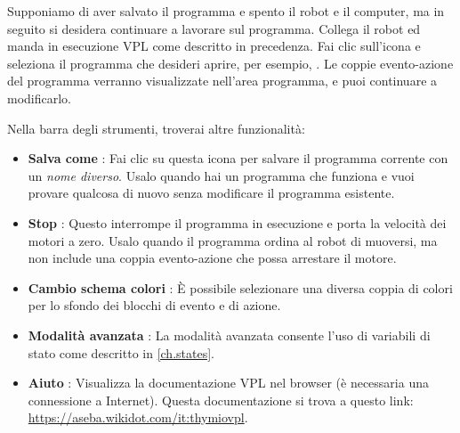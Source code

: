 
Supponiamo di aver salvato il programma e spento il robot e
il computer, ma in seguito si desidera continuare a lavorare sul programma.
Collega il robot ed manda in esecuzione VPL come descritto in precedenza. Fai clic sull'icona
 e seleziona il programma che desideri aprire, per esempio,
. Le coppie evento-azione del programma verranno visualizzate
nell'area programma, e puoi continuare a modificarlo.


Nella barra degli strumenti, troverai altre funzionalità:

\begin{itemize}

\item \textbf{Salva come} :
Fai clic su questa icona per salvare il programma corrente con un \emph{nome diverso}.
Usalo quando hai un programma che funziona e vuoi provare qualcosa di nuovo senza modificare il programma esistente.

\item \textbf{Stop} : Questo interrompe il programma in esecuzione
e porta la velocità dei motori a zero. Usalo quando il programma ordina
al robot di muoversi, ma non include una coppia evento-azione che possa
arrestare il motore.

\item \textbf{Cambio schema colori} : È possibile selezionare una
diversa coppia di colori per lo sfondo dei blocchi di evento e di azione.

\item \textbf{Modalità avanzata} : La modalità avanzata consente
l'uso di variabili di stato come descritto in \cref{ch.states}.

\item \textbf{Aiuto} : Visualizza la documentazione VPL nel
browser (è necessaria una connessione a Internet).
Questa documentazione si trova a questo link:
\url{https://aseba.wikidot.com/it:thymiovpl}.

\end{itemize}


